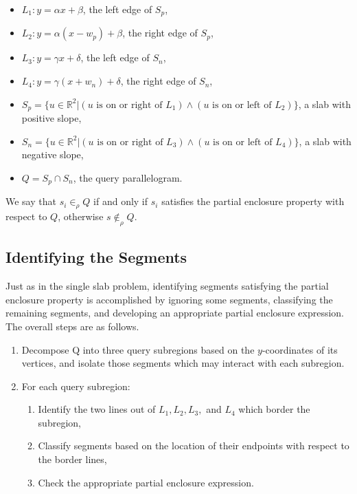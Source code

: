 \begin{itemize}
 \item $L_1 : y = \alpha x + \beta$, the left edge of $S_p$,

 \item $L_2 : y = \alpha (x - w_p) + \beta$, the right edge of $S_p$,

 \item $L_3 : y = \gamma x + \delta$, the left edge of $S_n$,

 \item $L_4 : y = \gamma (x + w_n) + \delta$, the right edge of $S_n$,

 \item $S_p = \{ u \in \mathbb{R}^2 | (u \text{ is on or right of } L_1) \wedge (u \text{ is on or left of } L_2) \}$, a slab with positive slope,

 \item $S_n = \{ u \in \mathbb{R}^2 | (u \text{ is on or right of } L_3) \wedge (u \text{ is on or left of } L_4) \}$, a slab with negative slope,

 \item $Q = S_p \cap S_n$, the query parallelogram.

\end{itemize}

We say that $s_i \in_\rho Q$ if and only if $s_i$ satisfies the partial enclosure property with respect to $Q$, otherwise $s \not \in_\rho Q$.


\subsection{Identifying the Segments}
\label{:slabs:two:approach}

Just as in the single slab problem, identifying segments satisfying the partial enclosure property is accomplished by ignoring some segments, classifying the remaining segments, and developing an appropriate partial enclosure expression.
The overall steps are as follows.

\begin{enumerate}
 \item Decompose Q into three query subregions based on the $y$-coordinates of its vertices, and isolate those segments which may interact with each subregion.

 \item For each query subregion:
 \begin{enumerate}
  \item Identify the two lines out of $L_1, L_2, L_3,$ and $L_4$ which border the subregion,
  \item Classify segments based on the location of their endpoints with respect to the border lines,
  \item Check the appropriate partial enclosure expression.
 \end{enumerate}
\end{enumerate}


